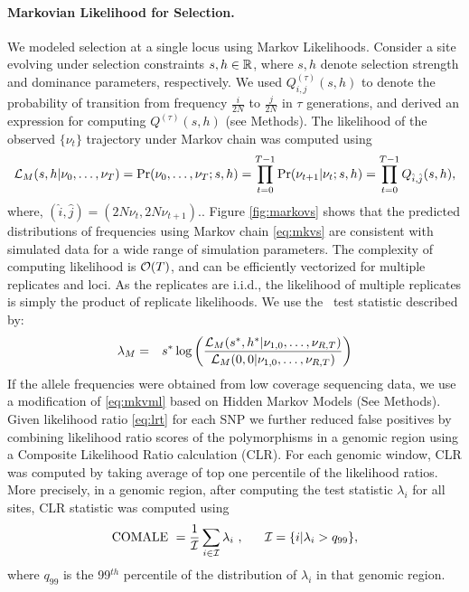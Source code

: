 \documentclass[11pt]{article}
\def\comale{\text{COMALE }}
\begin{document}
\paragraph{Markovian Likelihood for Selection.}
We modeled selection at a single locus using Markov
Likelihoods. Consider a site evolving under selection constraints
$s,h\in {\mathbb R}$, where $s,h$ denote selection strength and dominance
parameters, respectively. We used $Q^{(\tau)}_{i,j}(s,h)$ to denote
the probability of transition from frequency $\frac{i}{2N}$ to
$\frac{j}{2N}$ in $\tau$ generations, and derived an expression for
computing $Q^{(\tau)}(s,h)$ (see Methods). The likelihood of the
observed $\{\nu_t\}$ trajectory under Markov chain was computed using
\begin{equation}
  {\cal L}_{M}(s,h|\nu_0,\ldots,\nu_T)=\operatorname{Pr}(\nu_0,\ldots,\nu_T;s,h)=
  \prod_{t=0}^{T-1} \operatorname{Pr}(\nu_{t+1}|\nu_t;s,h) = \prod_{t=0}^{T-1} Q_{\hat{i},\hat{j}}(s,h),
  \label{eq:mkvlik}  
\end{equation}
where, $(\hat{i},\hat{j})=(2N\nu_t, 2N\nu_{t+1})$.. Figure \ref{fig:markovs} shows that the
predicted distributions of frequencies using Markov chain
\ref{eq:mkvs} are consistent with simulated data for a wide range of
simulation parameters. The complexity of computing likelihood is
${\cal O}(T)$, and can be efficiently vectorized for multiple replicates
and loci. As the replicates are i.i.d., the likelihood of multiple
replicates is simply the product of replicate likelihoods. We use the
\comale\ test statistic described by:
\begin{eqnarray}
\lambda_M &=& s^*\log 
\left(\frac{{\cal L}_M(s^*,h^*|\nu_{1,0},\ldots,\nu_{R,T})}{{\cal L}_M(0,0|\nu_{1,0},\ldots,\nu_{R,T})}\right)
\label{eq:mkvml}
\end{eqnarray}
If the allele frequencies were obtained from low coverage sequencing
data, we use a modification of \eqref{eq:mkvml} based on Hidden Markov
Models (See Methods).  Given likelihood ratio \eqref{eq:lrt} for each
SNP we further reduced false positives by combining likelihood ratio
scores of the polymorphisms in a genomic region using a Composite
Likelihood Ratio calculation
(CLR)\cite{nielsen2005genomic,williamson2007localizing,vitti2013detecting}.
For each genomic window, CLR was computed by taking average of top one
percentile of the likelihood ratios.  More precisely, in a genomic
region, after computing the test statistic ${\lambda_i}$ for all
sites, \comale CLR statistic was computed using
\begin{equation}
 \comale = \frac{1}{\Ic}\sum_{i \in
  \Ic} \lambda_i \ ,\ \ \ \ \ \Ic=\{i | \lambda_i > q_{99}\},  
  \label{eq:comale}
\end{equation}
where $q_{99}$ is the 99$^{th}$ percentile of the distribution of
${\lambda_i}$ in that genomic region.
\end{document}
